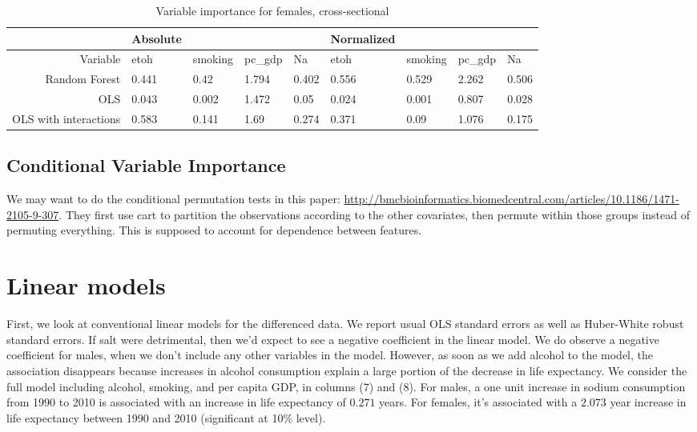 \documentclass[11pt]{article}\usepackage[]{graphicx}\usepackage[]{color}
\begin{document}
\begin{table}[ht]
\centering
\begin{tabular}{r|llll|llll}
   \hline
 & Absolute &  &  &  & Normalized &  &  &  \\ 
   \hline
Variable & etoh & smoking & pc\_gdp & Na & etoh & smoking & pc\_gdp & Na \\ 
  Random Forest & 0.441 & 0.42 & 1.794 & 0.402 & 0.556 & 0.529 & 2.262 & 0.506 \\ 
  OLS & 0.043 & 0.002 & 1.472 & 0.05 & 0.024 & 0.001 & 0.807 & 0.028 \\ 
  OLS with interactions & 0.583 & 0.141 & 1.69 & 0.274 & 0.371 & 0.09 & 1.076 & 0.175 \\ 
   \hline
\end{tabular}
\caption{Variable importance for females, cross-sectional} 
\end{table}



\subsection{Conditional Variable Importance}

We may want to do the conditional permutation tests in this paper: \url{http://bmcbioinformatics.biomedcentral.com/articles/10.1186/1471-2105-9-307}.
They first use cart to partition the observations according to the other covariates, then permute within those groups instead of permuting everything.
This is supposed to account for dependence between features.

\newpage
\section{Linear models}


First, we look at conventional linear models for the differenced data. We report usual OLS standard errors as well as Huber-White robust standard errors.
If salt were detrimental, then we'd expect to see a negative coefficient in the linear model.
We do observe a negative coefficient for males, when we don't include any other variables in the model.
However, as soon as we add alcohol to the model, the association disappears because increases in alcohol consumption explain a large portion of the decrease in life expectancy.
We consider the full model including alcohol, smoking, and per capita GDP, in columns (7) and (8).
For males, a one unit increase in sodium consumption from 1990 to 2010 is associated with an increase in life expectancy of $0.271$ years.
For females, it's associated with a $2.073$ year increase in life expectancy between 1990 and 2010 (significant at 10\% level).
\end{document}
